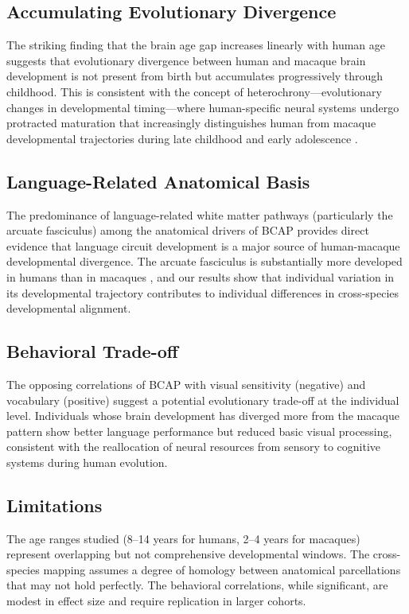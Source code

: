 \documentclass[12pt]{article}
\begin{document}
\subsection{Accumulating Evolutionary Divergence}

The striking finding that the brain age gap increases linearly with human age suggests that evolutionary divergence between human and macaque brain development is not present from birth but accumulates progressively through childhood. This is consistent with the concept of heterochrony---evolutionary changes in developmental timing---where human-specific neural systems undergo protracted maturation that increasingly distinguishes human from macaque developmental trajectories during late childhood and early adolescence \citep{sowell2003mapping}.

\subsection{Language-Related Anatomical Basis}

The predominance of language-related white matter pathways (particularly the arcuate fasciculus) among the anatomical drivers of BCAP provides direct evidence that language circuit development is a major source of human-macaque developmental divergence. The arcuate fasciculus is substantially more developed in humans than in macaques \citep{rilling2008evolution}, and our results show that individual variation in its developmental trajectory contributes to individual differences in cross-species developmental alignment.

\subsection{Behavioral Trade-off}

The opposing correlations of BCAP with visual sensitivity (negative) and vocabulary (positive) suggest a potential evolutionary trade-off at the individual level. Individuals whose brain development has diverged more from the macaque pattern show better language performance but reduced basic visual processing, consistent with the reallocation of neural resources from sensory to cognitive systems during human evolution.

\subsection{Limitations}

The age ranges studied (8--14 years for humans, 2--4 years for macaques) represent overlapping but not comprehensive developmental windows. The cross-species mapping assumes a degree of homology between anatomical parcellations that may not hold perfectly. The behavioral correlations, while significant, are modest in effect size and require replication in larger cohorts.
\end{document}
